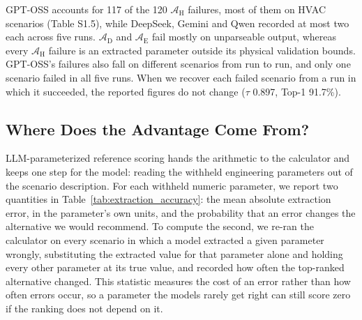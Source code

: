 \documentclass[final,3p,times]{elsarticle}
\begin{document}
GPT-OSS accounts for 117 of the 120 $\mathcal{A}_{\text{H}}$ failures, most of them on HVAC scenarios (Table S1.5), while DeepSeek, Gemini and Qwen recorded at most two each across five runs. $\mathcal{A}_{\text{D}}$ and $\mathcal{A}_{\text{E}}$ fail mostly on unparseable output, whereas every $\mathcal{A}_{\text{H}}$ failure is an extracted parameter outside its physical validation bounds. GPT-OSS's failures also fall on different scenarios from run to run, and only one scenario failed in all five runs. When we recover each failed scenario from a run in which it succeeded, the reported figures do not change ($\tau$ 0.897, Top-1 91.7\%).

\FloatBarrier
\subsection{Where Does the Advantage Come From?}
\label{sec:res-extraction}
LLM-parameterized reference scoring hands the arithmetic to the calculator and keeps one step for the model: reading the withheld engineering parameters out of the scenario description. For each withheld numeric parameter, we report two quantities in Table~\ref{tab:extraction_accuracy}: the mean absolute extraction error, in the parameter's own units, and the probability that an error changes the alternative we would recommend. To compute the second, we re-ran the calculator on every scenario in which a model extracted a given parameter wrongly, substituting the extracted value for that parameter alone and holding every other parameter at its true value, and recorded how often the top-ranked alternative changed. This statistic measures the cost of an error rather than how often errors occur, so a parameter the models rarely get right can still score zero if the ranking does not depend on it.
\end{document}
